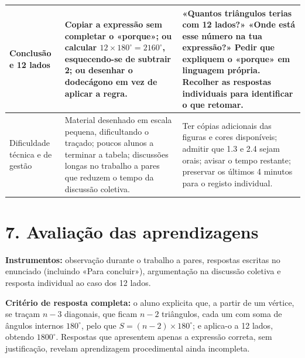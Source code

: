 \begin{longtable}{|p{2.55cm}|p{5.7cm}|p{6.65cm}|}
Conclusão e 12 lados&Copiar a expressão sem completar o «porque»; ou calcular $12\times180^\circ=2160^\circ$, esquecendo-se de subtrair 2; ou desenhar o dodecágono em vez de aplicar a regra.&«Quantos triângulos terias com 12 lados?» «Onde está esse número na tua expressão?» Pedir que expliquem o «porque» em linguagem própria. Recolher as respostas individuais para identificar o que retomar.\\\hline
Dificuldade técnica e de gestão&Material desenhado em escala pequena, dificultando o traçado; poucos alunos a terminar a tabela; discussões longas no trabalho a pares que reduzem o tempo da discussão coletiva.&Ter cópias adicionais das figuras e cores disponíveis; admitir que 1.3 e 2.4 sejam orais; avisar o tempo restante; preservar os últimos 4 minutos para o registo individual.\\\hline
\end{longtable}
\endgroup

\section*{7. Avaliação das aprendizagens}
\textbf{Instrumentos:} observação durante o trabalho a pares, respostas escritas no enunciado (incluindo «Para concluir»), argumentação na discussão coletiva e resposta individual ao caso dos 12 lados.

\textbf{Critério de resposta completa:} o aluno explicita que, a partir de um vértice, se traçam $n-3$ diagonais, que ficam $n-2$ triângulos, cada um com soma de ângulos internos $180^\circ$, pelo que $S=(n-2)\times180^\circ$; e aplica-o a 12 lados, obtendo $1800^\circ$. Respostas que apresentem apenas a expressão correta, sem justificação, revelam aprendizagem procedimental ainda incompleta.
